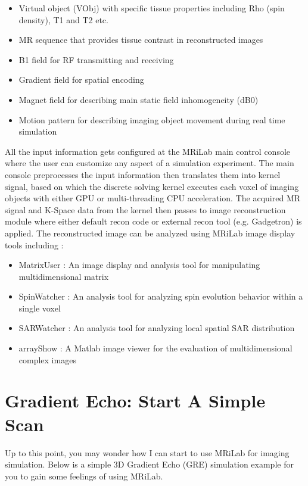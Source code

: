 \documentclass{book}%
\begin{document}
\begin{itemize}
	\item Virtual object (VObj) with specific tissue properties including Rho (spin density), T1 and T2 etc.
	\item MR sequence that provides tissue contrast in reconstructed images 
	\item B1 field for RF transmitting and receiving
	\item Gradient field for spatial encoding
	\item Magnet field for describing main static field inhomogeneity (dB0)
	\item Motion pattern for describing imaging object movement during real time simulation
\end{itemize}

All the input information gets configured at the MRiLab main control console where the user can customize any aspect of a simulation experiment. The main console preprocesses the input information then translates them into kernel signal, based on which the discrete solving kernel executes each voxel of imaging objects with either GPU or multi-threading CPU acceleration. The acquired MR signal and K-Space data from the kernel then passes to image reconstruction module where either default recon code or external recon tool (e.g. Gadgetron) is applied. The reconstructed image can be analyzed using MRiLab image display tools including :

\begin{itemize}
	\item MatrixUser : An image display and analysis tool for manipulating multidimensional matrix
	\item SpinWatcher : An analysis tool for analyzing spin evolution behavior within a single voxel
	\item SARWatcher : An analysis tool for analyzing local spatial SAR distribution
	\item arrayShow : A Matlab image viewer for the evaluation of multidimensional complex images
\end{itemize}

\section{Gradient Echo: Start A Simple Scan}

Up to this point, you may wonder how I can start to use MRiLab for imaging simulation. Below is a simple 3D Gradient Echo (GRE) simulation example for you to gain some feelings of using MRiLab.
\end{document}
